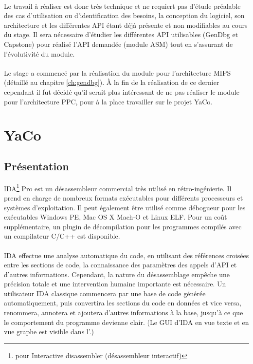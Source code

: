\documentclass[11pt, book, english, french, standardlists]{upmethodology-document}
\begin{document}
				\paragraph{}
					Le travail à réaliser est donc très technique et ne requiert pas d'étude préalable des cas d'utilisation ou d'identification des besoins, la conception du logiciel, son architecture et les différentes \gls{API} étant déjà présente et non modifiables au cours du stage. Il sera nécessaire d'étudier les différentes \gls{API} utilisables (GenDbg et Capstone) pour réalisé l'\gls{API} demandée (module ASM) tout en s'assurant de l'évolutivité du module.
				\paragraph*{}
					Le stage a commencé par la réalisation du module pour l'architecture \acrshort{MIPS} (détaillé au chapitre \ref{ch:gendbg}). À la fin de la réalisation de ce dernier cependant il fut décidé qu'il serait plus intéressant de ne pas réaliser le module pour l'architecture \acrshort{PPC}, pour à la place travailler sur le projet YaCo. %
		\section{YaCo}
			\subsection{Présentation}
					IDA\footnote{pour Interactive disassembler (désassembleur interactif)} Pro est un désassembleur commercial très utilisé en rétro-ingénierie. Il prend en charge de nombreux formats exécutables pour différents processeurs et systèmes d'exploitation. Il peut également être utilisé comme débogueur pour les exécutables \acrshort{Windows PE}, Mac OS X Mach-O et Linux \acrshort{ELF}. Pour un coût supplémentaire, un plugin de décompilation pour les programmes compilés avec un compilateur C/C++ est disponible.
				\paragraph*{}
					IDA effectue une analyse automatique du code, en utilisant des références croisées entre les sections de code, la connaissance des paramètres des appels d'\gls{API} et d'autres informations. Cependant, la nature du désassemblage empêche une précision totale et une intervention humaine importante est nécessaire. Un utilisateur IDA classique commencera par une base de code générée automatiquement, puis convertira les sections du code en données et vice versa, renommera, annotera et ajoutera d'autres informations à la base, jusqu'à ce que le comportement du programme devienne clair. (Le GUI d'IDA en vue texte et en vue graphe est visible dans l'.)
\end{document}
